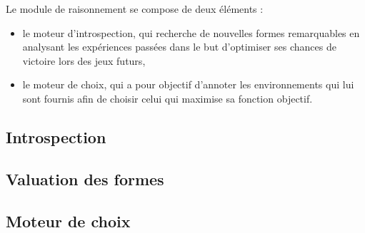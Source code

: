 Le module de raisonnement se compose de deux éléments : 
\begin{itemize}
\item le moteur d'introspection, qui recherche de nouvelles formes remarquables en analysant les expériences passées dans le but d'optimiser ses chances de victoire lors des jeux futurs,
\item le moteur de choix, qui a pour objectif d'annoter les environnements qui lui sont fournis afin de choisir celui qui maximise sa fonction objectif.
\end{itemize}


\subsection{Introspection}



\subsection{Valuation des formes}



\subsection{Moteur de choix}



